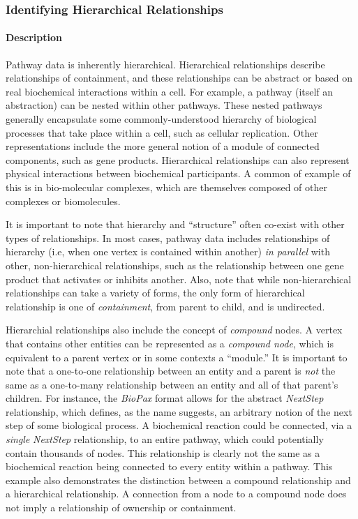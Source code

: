 \documentclass[twocolumn]{bmcart}%
\begin{document}
\subsubsection*{Identifying Hierarchical Relationships}

\paragraph*{Description}

Pathway data is inherently hierarchical.
Hierarchical relationships describe relationships of containment, and these relationships can be abstract or based on real biochemical interactions within a cell.
For example, a pathway (itself an abstraction) can be nested within other pathways.
These nested pathways generally encapsulate some commonly-understood hierarchy of biological processes that take place within a cell, such as cellular replication.
Other representations include the more general notion of a module of connected components, such as gene products.
Hierarchical relationships can also represent physical interactions between biochemical participants.
A common of example of this is in bio-molecular complexes, which are themselves composed of other complexes or biomolecules.

It is important to note that hierarchy and ``structure'' often co-exist with other types of relationships.
In most cases, pathway data includes relationships of hierarchy (i.e, when one vertex is contained within another) \textit{in parallel} with other, non-hierarchical relationships, such as the relationship between one gene product that activates or inhibits another.
Also, note that while non-hierarchical relationships can take a variety of forms, the only form of hierarchical relationship is one of \textit{containment}, from parent to child, and is undirected.

Hierarchial relationships also include the concept of \textit{compound} nodes.
A vertex that contains other entities can be represented as a \textit{compound node}, which is equivalent to a parent vertex or in some contexts a ``module.''
It is important to note that a one-to-one relationship between an entity and a parent is \textit{not} the same as a one-to-many relationship between an entity and all of that parent's children.
For instance, the \textit{BioPax} format allows for the abstract \emph{NextStep} relationship, which defines, as the name suggests, an arbitrary notion of the next step of some biological process.
A biochemical reaction could be connected, via a \textit{single} \emph{NextStep} relationship, to an entire pathway, which could potentially contain thousands of nodes.
This relationship is clearly not the same as a biochemical reaction being connected to every entity within a pathway.
This example also demonstrates the distinction between a compound relationship and a hierarchical relationship.
A connection from a node to a compound node does not imply a relationship of ownership or containment.
\end{document}

